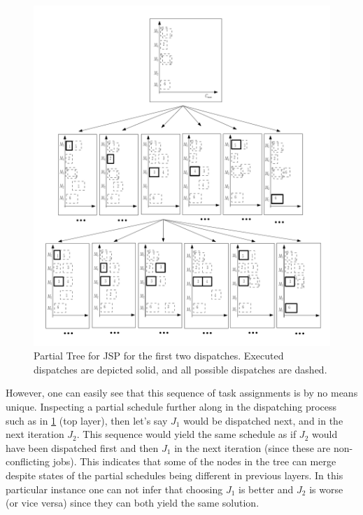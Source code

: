 \documentclass[smallextended]{llncs}
\begin{document}
\begin{figure}[t!]
\includegraphics[width=\columnwidth]{figures/gametree}
\caption[Partial Game Tree for JSP]{Partial Tree for JSP for the first two dispatches. 
Executed dispatches are depicted solid, and all possible dispatches are dashed.}
\label{fig:jssp:gametree}
\end{figure}

However, one can easily see that this sequence of task assignments is by no means unique. Inspecting a partial 
schedule further along in the dispatching process such as in  \cref{fig:jssp:gametree} (top layer), then let's say 
$J_1$ 
would be dispatched next, and in the next iteration $J_2$. This sequence would yield the same schedule as if $J_2$ 
would have been dispatched first and then $J_1$ in the next iteration (since these are non-conflicting jobs). 
This indicates that some of the nodes in the tree can merge despite states of the partial schedules being different in previous layers.  %
In this particular instance one can not infer that choosing $J_1$ is better and $J_2$ is worse (or vice versa) since they can both yield the same solution.
\end{document}
